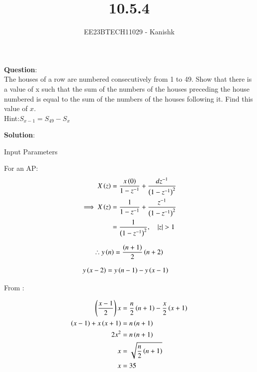\documentclass[journal,12pt,onecolumn]{IEEEtran}
\theoremstyle{remark}
\begin{document}

\vspace{3cm}

\title{10.5.4}
\author{EE23BTECH11029 - Kanishk}
\maketitle

\bigskip

\renewcommand{\thefigure}{\theenumi}
\renewcommand{\thetable}{\theenumi}
\textbf{Question}:\\
The houses of a row are numbered consecutively from 1 to 49. Show that there is a value
of x such that the sum of the numbers of the houses preceding the house numbered is equal to the sum of the numbers of the houses following it. Find this value of $x$.\\
Hint:$ S_{x-1}=S_{49}-S_x$

\textbf{Solution}:\\

\begin{table}[ht]
    \centering
    \def\arraystretch{2.5}
    
   \caption{Input Parameters}
   \label{tab:10.5.4}
\end{table}

For an AP: 
\begin{align}
X\left(z\right)&=\frac{x\left(0\right)}{1-z^{-1}}+ \frac{dz^{-1}}{\left(1-z^{-1}\right)^{2}}\\
\implies X\left(z\right)&=\frac{1}{1-z^{-1}}+ \frac{z^{-1}}{\left(1-z^{-1}\right)^{2}}\\
&=\frac{1}{\left(1-z^{-1}\right)^{2}},\quad \left\vert z\right\vert > 1
\end{align}

\begin{align}
    \therefore y\left(n\right)=\frac{\left(n+1\right)}{2}\left(n+2\right)
\end{align}

\begin{align}
y\left(x-2\right)&=y\left(n-1\right)-y\left(x-1\right)
\end{align}

\newpage
From :

\begin{align}
\left(\frac{x-1}{2}\right)x&=\frac{n}{2}\left(n+1\right)-\frac{x}{2}\left(x+1\right)\\
\left(x-1\right)+x\left(x+1\right)&=n\left(n+1\right)\\
2x^{2}&=n\left(n+1\right)\\
x&=\sqrt{\frac{n}{2}\left(n+1\right)}\\
x&=35
\end{align}
\end{document}
